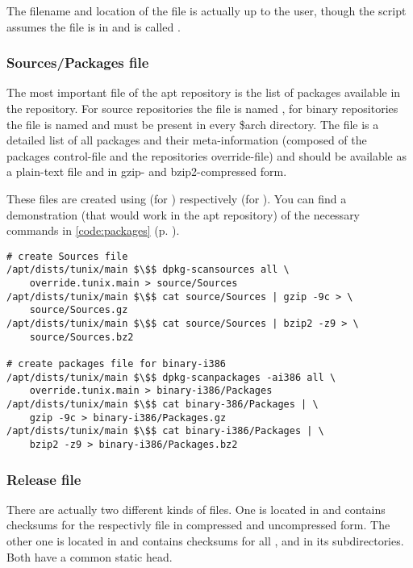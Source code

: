 The filename and location of the file is actually up to the user, though the
script  assumes the file is in 
and is called .

\subsubsection{Sources/Packages file}
The most important file of the apt repository is the list of packages available
in the repository. For source repositories the file is named , for
binary repositories the file is named  and must be present in
every \$arch directory. The file is a detailed list of all packages and their
meta-information (composed of the packages control-file and the repositories
override-file) and should be available as a plain-text file and in gzip-
and bzip2-compressed form.

These files are created using  (for ) 
respectively  (for ). You can find a
demonstration (that would work in the \tunix apt repository) of the necessary
commands in \lstlistingname{} \ref{code:packages} (p. \pageref{code:packages}).

\begin{lstlisting}[label=code:packages,caption=Creating Sources and Packages
files,float=ht]
# create Sources file
/apt/dists/tunix/main $\$$ dpkg-scansources all \
	override.tunix.main > source/Sources
/apt/dists/tunix/main $\$$ cat source/Sources | gzip -9c > \
	source/Sources.gz
/apt/dists/tunix/main $\$$ cat source/Sources | bzip2 -z9 > \
	source/Sources.bz2

# create packages file for binary-i386
/apt/dists/tunix/main $\$$ dpkg-scanpackages -ai386 all \
	override.tunix.main > binary-i386/Packages
/apt/dists/tunix/main $\$$ cat binary-386/Packages | \
	gzip -9c > binary-i386/Packages.gz
/apt/dists/tunix/main $\$$ cat binary-i386/Packages | \
	bzip2 -z9 > binary-i386/Packages.bz2
\end{lstlisting}

\subsubsection{Release file}
There are actually two different kinds of  files. One is located in
\file{dists/\$dist/\$comp/\$arch/} and contains checksums for the
\file{Packages} respectivly  file in compressed and uncompressed
form. The other one is located in  and contains checksums for all
,  and  in its subdirectories. Both
have a common static head. 

